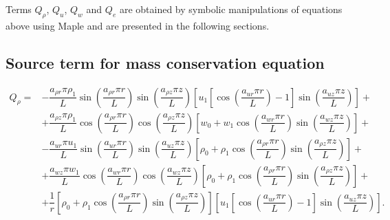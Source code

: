 \documentclass[a4paper,10pt]{article}
\begin{document}
\begin{landscape}
Terms $Q_\rho$, $Q_u$,  $Q_w$ and $Q_{e}$ are obtained by symbolic manipulations of equations above using Maple and are presented in the following sections.


\subsection{Source term for mass conservation equation}


\begin{equation}
 \begin{split}
 \displaystyle
Q_{\rho} =
&-\dfrac{a_{\rho r} \pi \rho_1}{L} \sin\left(\dfrac{a_{\rho r} \pi r}{L}\right) \sin\left(\dfrac{a_{\rho z} \pi z}{L}\right) \left[u_1 \left[\cos\left(\dfrac{a_{ur} \pi r}{L}\right)-1\right] \sin\left(\dfrac{a_{uz} \pi z}{L}\right) \right]+\\
&+\dfrac{a_{\rho z} \pi \rho_1 }{L} \cos\left(\dfrac{a_{\rho r} \pi r}{L}\right) \cos\left(\dfrac{a_{\rho z} \pi z}{L}\right)  \left[w_0 + w_1 \cos\left(\dfrac{a_{wr} \pi r}{L}\right) \sin\left(\dfrac{a_{wz} \pi z}{L}\right) \right] +\\
&-\dfrac{a_{ur} \pi u_1 }{L}\sin\left(\dfrac{a_{ur} \pi r}{L}\right)  \sin\left(\dfrac{a_{uz} \pi z}{L}\right)   \left[\rho_0 + \rho_1 \cos\left(\dfrac{a_{\rho r} \pi r}{L}\right) \sin\left(\dfrac{a_{\rho z} \pi z}{L}\right) \right] +\\
&+\dfrac{a_{wz} \pi w_1 }{L}\cos\left(\dfrac{a_{wr} \pi r}{L}\right) \cos\left(\dfrac{a_{wz} \pi z}{L}\right)  \left[\rho_0 + \rho_1 \cos\left(\dfrac{a_{\rho r} \pi r}{L}\right) \sin\left(\dfrac{a_{\rho z} \pi z}{L}\right) \right] +\\
&+ \dfrac{1}{r}\left[\rho_0 + \rho_1 \cos\left(\dfrac{a_{\rho r} \pi r}{L}\right) \sin\left(\dfrac{a_{\rho z} \pi z}{L}\right) \right]  \left[u_1 \left[\cos\left(\dfrac{a_{ur} \pi r}{L}\right)-1\right] \sin\left(\dfrac{a_{uz} \pi z}{L}\right) \right].
\end{split}
\end{equation}
%

\end{landscape}
\end{document}
